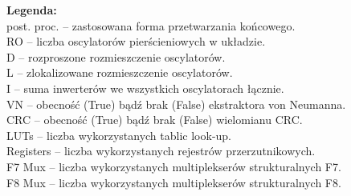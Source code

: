 \begin{table}[H]
\par\vspace{2mm}
\begin{minipage}{0.9\textwidth}
\small
\textbf{Legenda:}\\
post. proc. -- zastosowana forma przetwarzania końcowego. \\
RO -- liczba oscylatorów pierścieniowych w układzie.\\
D -- rozproszone rozmieszczenie oscylatorów. \\
L -- zlokalizowane rozmieszczenie oscylatorów. \\
I -- suma inwerterów we wszystkich oscylatorach łącznie.\\
VN -- obecność (True) bądź brak (False) ekstraktora von Neumanna. \\
CRC -- obecność (True) bądź brak (False) wielomianu CRC. \\
LUTs -- liczba wykorzystanych tablic look-up. \\
Registers -- liczba wykorzystanych rejestrów przerzutnikowych. \\
F7 Mux -- liczba wykorzystanych multiplekserów strukturalnych F7. \\
F8 Mux -- liczba wykorzystanych multiplekserów strukturalnych F8.
\end{minipage}

\end{table}